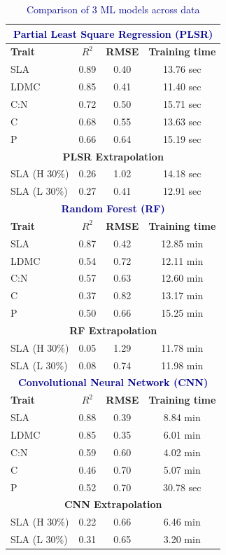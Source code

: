 \documentclass[12pt,a4paper]{report}
\begin{document}
\begin{table}[h!]
\centering
\caption{\textcolor{darkblue}{Comparison of 3 ML models across data}}
\label{tab:leaf-trait-analysis}
\begin{tabular}{lccc}
\toprule
\multicolumn{4}{c}{\textbf{\textcolor{darkblue}{Partial Least Square Regression (PLSR)}}} \\ 
\midrule
\textbf{Trait} & \textbf{$R^2$} & \textbf{RMSE} & \textbf{Training time} \\
\midrule
SLA  & 0.89 & 0.40 & 13.76 sec \\
LDMC & 0.85 & 0.41 & 11.40 sec \\
C:N  & 0.72 & 0.50 & 15.71 sec \\
C    & 0.68 & 0.55 & 13.63 sec \\
P    & 0.66 & 0.64 & 15.19 sec \\
\midrule
\multicolumn{4}{c}{\textbf{{PLSR Extrapolation}}} \\ 
\midrule
SLA (H 30\%) & 0.26 & 1.02 &  14.18 sec \\
SLA  (L 30\%)& 0.27 & 0.41 &  12.91 sec \\
\midrule
\multicolumn{4}{c}{\textbf{\textcolor{darkblue}{Random Forest (RF)}}} \\ 
\midrule
\textbf{Trait} & \textbf{$R^2$} & \textbf{RMSE} & \textbf{Training time} \\
\midrule
SLA  & 0.87 & 0.42 & 12.85 min \\
LDMC & 0.54 & 0.72 & 12.11 min \\
C:N  & 0.57 & 0.63 & 12.60 min \\
C    & 0.37 & 0.82 & 13.17 min \\
P    & 0.50 & 0.66 & 15.25 min \\
\midrule
\multicolumn{4}{c}{\textbf{{RF Extrapolation}}} \\ 
\midrule
SLA (H 30\%) & 0.05 & 1.29 &  11.78 min \\
SLA  (L 30\%)& 0.08 & 0.74 & 11.98 min \\
\midrule
\multicolumn{4}{c}{\textbf{\textcolor{darkblue}{Convolutional Neural Network (CNN)}}} \\
\midrule
\textbf{Trait} & \textbf{$R^2$} & \textbf{RMSE} & \textbf{Training time} \\
\midrule
SLA  & 0.88 & 0.39 & 8.84 min \\
LDMC & 0.85 & 0.35 & 6.01 min \\
C:N  & 0.59 & 0.60 & 4.02 min \\
C    & 0.46 & 0.70 & 5.07 min \\
P    & 0.52 & 0.70 & 30.78 sec \\
\midrule
\multicolumn{4}{c}{\textbf{{CNN Extrapolation}}} \\ 
\midrule
SLA (H 30\%) & 0.22 & 0.66 &  6.46 min \\
SLA  (L 30\%)& 0.31 & 0.65 & 3.20 min \\
\bottomrule
\end{tabular}
\end{table}
\end{document}
